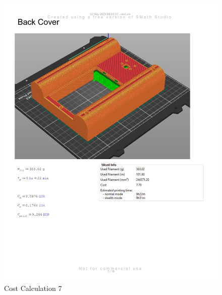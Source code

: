 \begin{figure}[H]
    \centering
    \includegraphics[width=\linewidth]{texs/appendix/data/costcalculation/cost1-07.jpg}
    \caption{Cost Calculation 7}
    \label{fig:cost-calculation-7}
\end{figure}

